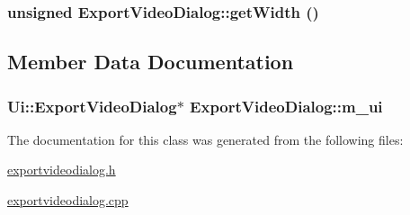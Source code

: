 \hypertarget{class_export_video_dialog_7362ec377ee65b540958211872d5d462}{
\subsubsection[{getWidth}]{\setlength{\rightskip}{0pt plus 5cm}unsigned ExportVideoDialog::getWidth ()}}
\label{class_export_video_dialog_7362ec377ee65b540958211872d5d462}




\subsection{Member Data Documentation}
\hypertarget{class_export_video_dialog_a95d79216bb3533116b5f1f40c5aff75}{
\subsubsection[{m\_\-ui}]{\setlength{\rightskip}{0pt plus 5cm}Ui::ExportVideoDialog$\ast$ {\bf ExportVideoDialog::m\_\-ui}}}
\label{class_export_video_dialog_a95d79216bb3533116b5f1f40c5aff75}




The documentation for this class was generated from the following files:\begin{CompactItemize}
\item 
\hyperlink{exportvideodialog_8h}{exportvideodialog.h}\item 
\hyperlink{exportvideodialog_8cpp}{exportvideodialog.cpp}\end{CompactItemize}
